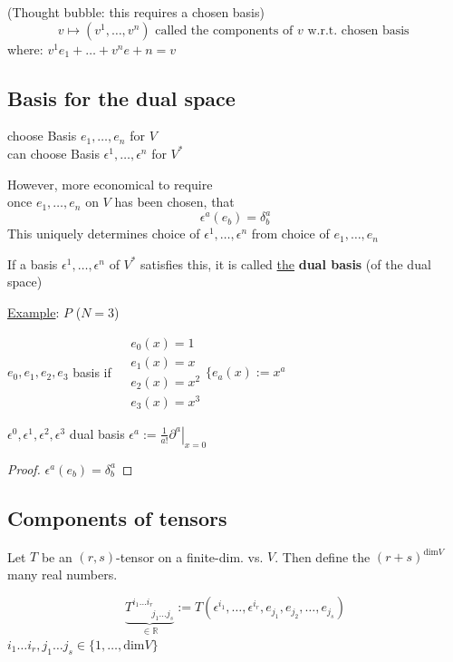 (Thought bubble: this requires a chosen basis)
\[
v \mapsto (v^1 , \dots , v^n)  \text{ called the components of $v$ w.r.t. chosen basis }
\]
where: $v^1 e_1 + \dots + v^n e+n = v$

\subsection{Basis for the dual space}

choose Basis $e_1, \dots, e_n$ for $V$ \\
can choose Basis $\epsilon^1, \dots , \epsilon^n$ for $V^*$

However, more economical to require \\
once $e_1 , \dots , e_n$ on $V$ has been chosen, that
\[
\epsilon^a(e_b) = \delta^a_b
\]
This uniquely determines choice of $\epsilon^1, \dots , \epsilon^n$ from choice of $e_1, \dots , e_n$

\begin{definition}
	If a basis $\epsilon^1, \dots , \epsilon^n$ of $V^*$ satisfies this, it is called \underline{the} \textbf{dual basis} (of the dual space)
\end{definition}

\underline{Example}: $P$ ($N=3$)

$e_0, e_1, e_2, e_3$ basis if $\begin{aligned} & e_0(x) = 1 \\ 
& e_1(x) = x \\ 
& e_2(x) = x^2 \\ 
& e_3(x) = x^3 \end{aligned} \lbrace e_a(x):=x^a$

$\epsilon^0, \epsilon^1, \epsilon^2, \epsilon^3$ dual basis $\epsilon^a := \frac{1}{a!} \left. \partial^a \right|_{x=0}$

\begin{proof}
	$\epsilon^a(e_b) = \delta^a_b$
\end{proof}

\subsection{Components of tensors}

Let $T$ be an $(r,s)$-tensor on a finite-dim. vs. $V$.  Then define the $(r+s)^{\text{dim}V}$ many real numbers.  

\[
\underbrace{T^{i_1 \dots i_r}_{ \qquad \, j_1 \dots j_s} }_{\in \mathbb{R}} := T(\epsilon^{i_1}, \dots , \epsilon^{i_r} , e_{j_1} , e_{j_2}, \dots, e_{j_s} )
\]
$i_1 \dots i_r, j_1 \dots j_s \in \lbrace 1 , \dots , \text{dim}V \rbrace$

